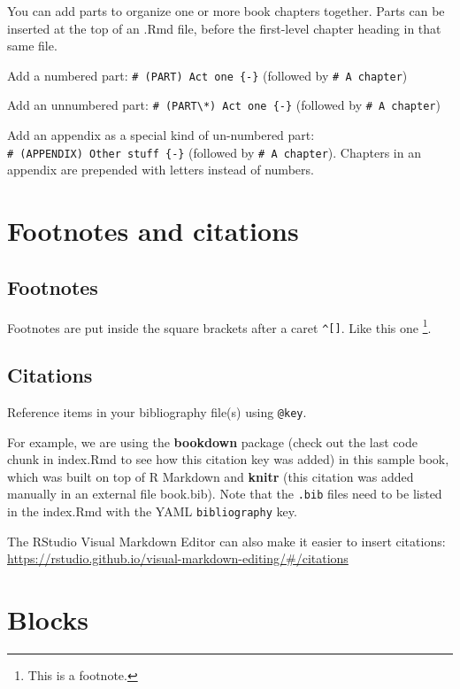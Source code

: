 \documentclass[
]{book}
\begin{document}
You can add parts to organize one or more book chapters together. Parts can be inserted at the top of an .Rmd file, before the first-level chapter heading in that same file.

Add a numbered part: \texttt{\#\ (PART)\ Act\ one\ \{-\}} (followed by \texttt{\#\ A\ chapter})

Add an unnumbered part: \texttt{\#\ (PART\textbackslash{}*)\ Act\ one\ \{-\}} (followed by \texttt{\#\ A\ chapter})

Add an appendix as a special kind of un-numbered part: \texttt{\#\ (APPENDIX)\ Other\ stuff\ \{-\}} (followed by \texttt{\#\ A\ chapter}). Chapters in an appendix are prepended with letters instead of numbers.

\chapter{Footnotes and citations}\label{footnotes-and-citations}

\section{Footnotes}\label{footnotes}

Footnotes are put inside the square brackets after a caret \texttt{\^{}{[}{]}}. Like this one \footnote{This is a footnote.}.

\section{Citations}\label{citations}

Reference items in your bibliography file(s) using \texttt{@key}.

For example, we are using the \textbf{bookdown} package \citep{R-bookdown} (check out the last code chunk in index.Rmd to see how this citation key was added) in this sample book, which was built on top of R Markdown and \textbf{knitr} \citep{xie2015} (this citation was added manually in an external file book.bib).
Note that the \texttt{.bib} files need to be listed in the index.Rmd with the YAML \texttt{bibliography} key.

The RStudio Visual Markdown Editor can also make it easier to insert citations: \url{https://rstudio.github.io/visual-markdown-editing/\#/citations}

\chapter{Blocks}\label{blocks}
\end{document}
